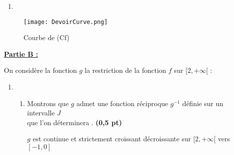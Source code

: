 \documentclass[12pt,a4paper]{article}
\begin{document}
\begin{enumerate}
\begin{enumerate}
\begin{center}
\end{center}
\begin{center}
\end{center}
\end{enumerate}
\item 
\end{enumerate}
\begin{center}
\begin{figure}[h]%
\centering
\texttt{[image: DevoirCurve.png]}
\caption{Courbe de (Cf)}
\label{fig:monimage}
\end{figure}
\end{center}
\underline{\textbf{Partie B :}}

On considère la fonction \( g \) la restriction de la fonction \( f \) sur \( [2, +\infty[ \) :

\begin{enumerate}
\item[]
\begin{enumerate}
\item Montrons que \( g \) admet une fonction réciproque \( g^{-1} \) définie sur un intervalle \( J \)\\ que l’on déterminera . \hspace{1cm} \textbf{(0,5 pt)}
    
\( g \) est continue et strictement croissant décroissante sur \( [2, +\infty[ \) vers \( [-1, 0] \)
    
    
\end{enumerate}
\end{enumerate}
\end{document}
